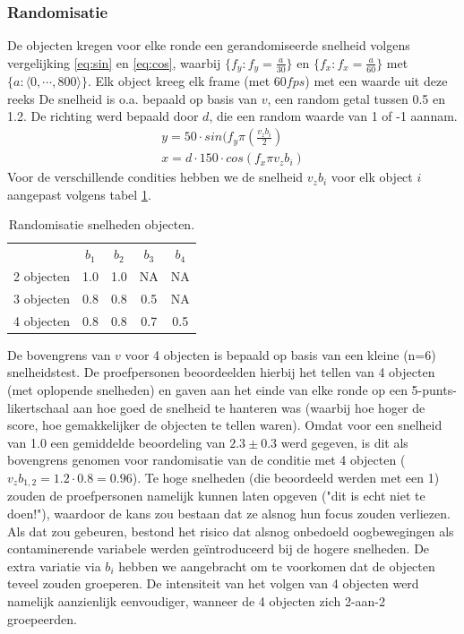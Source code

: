 \documentclass[a4paper,jou]{apa6}  %
\begin{document}
\subsubsection{Randomisatie}
De objecten kregen voor elke ronde een gerandomiseerde snelheid volgens vergelijking \ref{eq:sin} en \ref{eq:cos}, waarbij $\{f_{y} : f_{y}=\frac{a}{30}\}$ en $\{f_{x} : f_{x}=\frac{a}{60}\}$ met $\{a : \langle 0,\cdots,800\rangle\}$. Elk object kreeg elk frame (met $60fps$) met een waarde uit deze reeks  De snelheid is o.a. bepaald op basis van $v$, een random getal tussen 0.5 en 1.2. De richting werd bepaald door $d$, die een random waarde van 1 of -1 aannam.
\begin{align}
y = 50 \cdot sin(f_{y} \pi (\frac{v_{z} b_{i}}{2}) \label{eq:sin}
\\
x = d \cdot 150 \cdot cos(f_{x} \pi v_{z} b_{i}) \label{eq:cos}
\end{align}
Voor de verschillende condities hebben we de snelheid $v_{z} b_{i}$ voor elk object $i$ aangepast volgens tabel \ref{tab:randomSnelheden}. 
\begin{table}
\caption{\label{tab:randomSnelheden}Randomisatie snelheden objecten.}
\begin{tabular}{c c c c c}\hline
\centering
	& \underline{$b_{1}$} & \underline{$b_{2}$} & \underline{$b_{3}$} & \underline{$b_{4}$} \\
	2 objecten & 1.0 & 1.0 & NA & NA\\
	3 objecten & 0.8 & 0.8 & 0.5 & NA\\
	4 objecten & 0.8 & 0.8 & 0.7 & 0.5 \\
\hline
\end{tabular}
\end{table}
De bovengrens van $v$ voor 4 objecten is bepaald op basis van een kleine (n=6) snelheidstest. De proefpersonen beoordeelden hierbij het tellen van 4 objecten (met oplopende snelheden) en gaven aan het einde van elke ronde op een 5-punts-likertschaal \cite{likert1932technique} aan hoe goed de snelheid te hanteren was (waarbij hoe hoger de score, hoe gemakkelijker de objecten te tellen waren). Omdat voor een snelheid van 1.0 een gemiddelde beoordeling van $2.3 \pm 0.3$ werd gegeven, is dit als bovengrens genomen voor randomisatie van de conditie met 4 objecten ($v_{z} b_{1,2} = 1.2 \cdot 0.8 = 0.96$). Te hoge snelheden (die beoordeeld werden met een 1) zouden de proefpersonen namelijk kunnen laten opgeven ("dit is echt niet te doen!"), waardoor de kans zou bestaan dat ze alsnog hun focus zouden verliezen. Als dat zou gebeuren, bestond het risico dat alsnog onbedoeld oogbewegingen als contaminerende variabele werden geïntroduceerd bij de hogere snelheden. De extra variatie via $b_{i}$ hebben we aangebracht om te voorkomen dat de objecten teveel zouden groeperen. De intensiteit van het volgen van 4 objecten werd namelijk aanzienlijk eenvoudiger, wanneer de 4 objecten zich 2-aan-2 groepeerden. 
\end{document}
